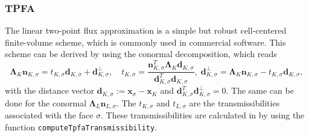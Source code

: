 \subsubsection{TPFA}\label{cc_tpfa}
The linear two-point flux approximation is a simple but robust cell-centered finite-volume scheme, which is commonly used in commercial software. 
This scheme can be derived by using the conormal decomposition, which reads
\begin{equation}
\mathbf{\Lambda}_K \mathbf{n}_{K, \sigma} = t_{K,\sigma} \mathbf{d}_{K,\sigma} + \mathbf{d}^{\bot}_{K,\sigma}, \quad  t_{K,\sigma} = \frac{\mathbf{n}_{K, \sigma}^T \mathbf{\Lambda}_K \mathbf{d}_{K,\sigma} }{\mathbf{d}_{K,\sigma}^T \mathbf{d}_{K,\sigma}}, \; \mathbf{d}^{\bot}_{K,\sigma} = \mathbf{\Lambda}_K \mathbf{n}_{K, \sigma} - t_{K,\sigma} \mathbf{d}_{K,\sigma},
\end{equation}
with the distance vector $\mathbf{d}_{K,\sigma} := \mathbf{x}_\sigma - \mathbf{x}_K$ and $\mathbf{d}_{K,\sigma}^T \mathbf{d}^{\bot}_{K,\sigma} = 0$. The same can be done for the conormal $\mathbf{\Lambda}_L \mathbf{n}_{L, \sigma}$. The $t_{K,\sigma}$ and $t_{L,\sigma}$ are the transmissibilities associated with the face $\sigma$. These transmissibilities are calculated in \Dumux by using the function \texttt{computeTpfaTransmissibility}.

